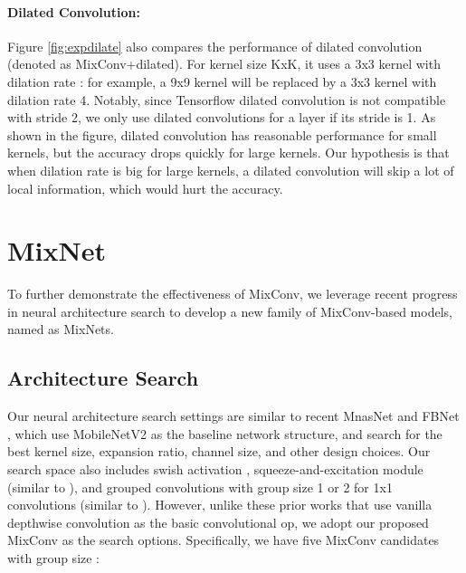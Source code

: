 \documentclass{sty/bmvc2k}
\begin{document}
\paragraph{Dilated Convolution:} 

Figure \ref{fig:expdilate} also compares the performance of dilated convolution (denoted as MixConv+dilated). For kernel size KxK, it uses a 3x3 kernel with dilation rate : for example, a 9x9 kernel will be replaced by a 3x3 kernel with dilation rate 4. Notably, since Tensorflow dilated convolution is not compatible with stride 2, we only use dilated convolutions for a layer if its stride is 1.  As shown in the figure, dilated convolution has reasonable performance for small kernels, but the accuracy drops quickly for large kernels. Our hypothesis is that when dilation rate is big for large kernels, a dilated convolution will skip a lot of local information, which would hurt the accuracy. \section{MixNet}
\label{sec:nas}

To further demonstrate the effectiveness of MixConv, we leverage recent progress in neural architecture search to develop a new family of MixConv-based models, named as MixNets.

\subsection{Architecture Search}

Our neural architecture search settings are similar to recent MnasNet \cite{mnas19} and FBNet \cite{fbnet19}, which use MobileNetV2 \cite{mobilenetv218} as the baseline network structure, and search for the best kernel size, expansion ratio, channel size, and other design choices.  Our search space also includes swish activation \cite{swish18,swishsil18}, squeeze-and-excitation module \cite{senet18} (similar to \cite{mnas19}), and grouped convolutions with group size 1 or 2 for 1x1 convolutions (similar to \cite{fbnet19}).
However, unlike these prior works that use vanilla depthwise  convolution as the basic convolutional op, we adopt our proposed MixConv as the search options. Specifically, we have five MixConv candidates with group size :
\end{document}
